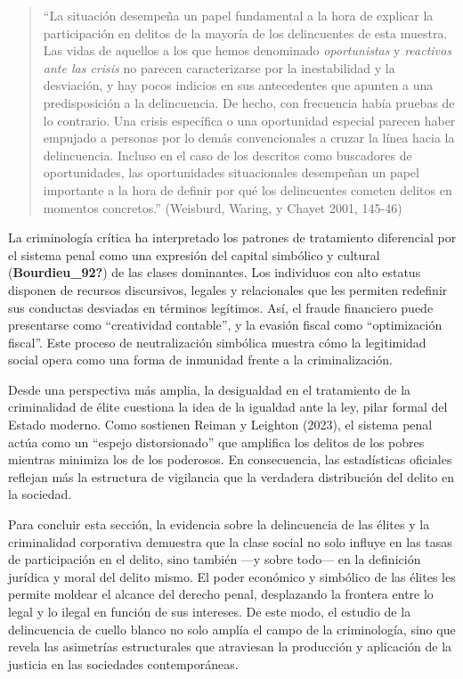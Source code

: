 \documentclass[
  spanish,
  letterpaper,
  DIV=11,
  numbers=noendperiod]{scrreprt}
\begin{document}
\begin{quote}
``La situación desempeña un papel fundamental a la hora de explicar la
participación en delitos de la mayoría de los delincuentes de esta
muestra. Las vidas de aquellos a los que hemos denominado
\emph{oportunistas} y \emph{reactivos ante las crisis} no parecen
caracterizarse por la inestabilidad y la desviación, y hay pocos
indicios en sus antecedentes que apunten a una predisposición a la
delincuencia. De hecho, con frecuencia había pruebas de lo contrario.
Una crisis específica o una oportunidad especial parecen haber empujado
a personas por lo demás convencionales a cruzar la línea hacia la
delincuencia. Incluso en el caso de los descritos como buscadores de
oportunidades, las oportunidades situacionales desempeñan un papel
importante a la hora de definir por qué los delincuentes cometen delitos
en momentos concretos.'' (Weisburd, Waring, y Chayet 2001, 145-46)
\end{quote}

La criminología crítica ha interpretado los patrones de tratamiento
diferencial por el sistema penal como una expresión del capital
simbólico y cultural (\textbf{Bourdieu\_92?}) de las clases dominantes.
Los individuos con alto estatus disponen de recursos discursivos,
legales y relacionales que les permiten redefinir sus conductas
desviadas en términos legítimos. Así, el fraude financiero puede
presentarse como ``creatividad contable'', y la evasión fiscal como
``optimización fiscal''. Este proceso de neutralización simbólica
muestra cómo la legitimidad social opera como una forma de inmunidad
frente a la criminalización.

Desde una perspectiva más amplia, la desigualdad en el tratamiento de la
criminalidad de élite cuestiona la idea de la igualdad ante la ley,
pilar formal del Estado moderno. Como sostienen Reiman y Leighton
(2023), el sistema penal actúa como un ``espejo distorsionado'' que
amplifica los delitos de los pobres mientras minimiza los de los
poderosos. En consecuencia, las estadísticas oficiales reflejan más la
estructura de vigilancia que la verdadera distribución del delito en la
sociedad.

Para concluir esta sección, la evidencia sobre la delincuencia de las
élites y la criminalidad corporativa demuestra que la clase social no
solo influye en las tasas de participación en el delito, sino también
---y sobre todo--- en la definición jurídica y moral del delito mismo.
El poder económico y simbólico de las élites les permite moldear el
alcance del derecho penal, desplazando la frontera entre lo legal y lo
ilegal en función de sus intereses. De este modo, el estudio de la
delincuencia de cuello blanco no solo amplía el campo de la
criminología, sino que revela las asimetrías estructurales que
atraviesan la producción y aplicación de la justicia en las sociedades
contemporáneas.
\end{document}
